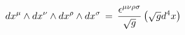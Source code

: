 \begin{equation}
dx^{\mu}\wedge dx^{\nu}\wedge dx^{\rho}\wedge
dx^{\sigma}\,=\,{\epsilon^{\mu\nu\rho\sigma}\over \sqrt g}\left(
\sqrt g d^4x \right)
\end{equation}

